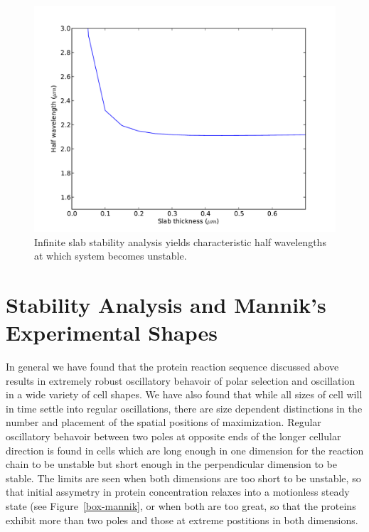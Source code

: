 \documentclass[letterpaper,twocolumn,amsmath,amssymb,pre]{revtex4-1}
\begin{document}
\begin{figure}
  \includegraphics[width=\columnwidth]{stability-analysis}
  \caption{Infinite slab stability analysis yields characteristic half
    wavelengths at which system becomes unstable.}
    \label{fig:stability-analysis}
\end{figure}

\section{Stability Analysis and Mannik's Experimental Shapes}
In general we have found that the protein reaction sequence discussed
above results in extremely robust oscillatory behavoir of polar
selection and oscillation in a wide variety of cell shapes.  We have
also found that while all sizes of cell will in time settle into
regular oscillations, there are size dependent distinctions in the
number and placement of the spatial positions of maximization.
Regular oscillatory behavoir between two poles at opposite ends of the
longer cellular direction is found in cells which are long enough in
one dimension for the reaction chain to be unstable but short enough
in the perpendicular dimension to be stable.  The limits are seen when
both dimensions are too short to be unstable, so that initial
assymetry in protein concentration relaxes into a motionless steady
state (see Figure~\ref{box-mannik}, or when both are too great, so
that the proteins exhibit more than two poles and those at extreme
postitions in both dimensions.
\end{document}
